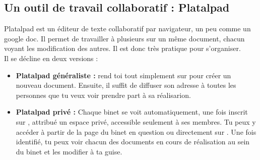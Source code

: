 \subsection{Un outil de travail collaboratif : Platalpad}
\label{platalpad}

Platalpad est un éditeur de texte collaboratif par navigateur, un peu comme un google doc. Il permet de travailler à plusieurs sur un même document, chacun voyant les modification des autres. Il est donc très pratique pour s'organiser.\\
Il se décline en deux versions :
\begin{itemize}

\item \textbf{Platalpad généraliste :} rend toi tout simplement sur  pour créer un nouveau document. Ensuite, il suffit de diffuser son adresse à toutes les personnes que tu veux voir prendre part à sa réalisarion. \\

\item \textbf{Platalpad privé :} Chaque binet se voit automatiquement, une fois inscrit sur \fkz, attribué un espace privé, accessible seulement à ses membres. Tu peux y accéder à partir de la page \fkz du binet en question ou directement sur . Une fois identifié, tu peux voir chacun des documents en cours de réalisation au sein du binet et les modifier à ta guise.

\end{itemize}



